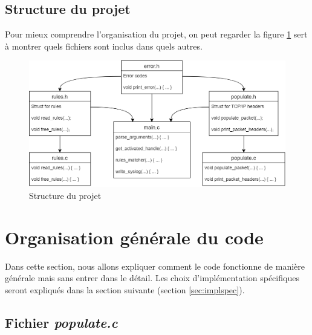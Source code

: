 \documentclass[a4paper]{article}
\begin{document}
\subsection{Structure du projet}



Pour mieux comprendre l'organisation du projet, on peut regarder la figure \ref{fig:structproj} sert à montrer quels fichiers sont inclus dans quels autres.

\begin{figure}[H]
    \includegraphics[width=0.99\linewidth]{../markdown-explanations/images/project-structure.png}
    \caption{Structure du projet}
    \label{fig:structproj}
\end{figure}










\section{Organisation générale du code}



Dans cette section, nous allons expliquer comment le code fonctionne de manière générale mais sans entrer dans le détail. Les choix d'implémentation spécifiques seront expliqués dans la section suivante (section \ref{sec:implspec}).





\subsection{Fichier \textit{populate.c}}
\end{document}
